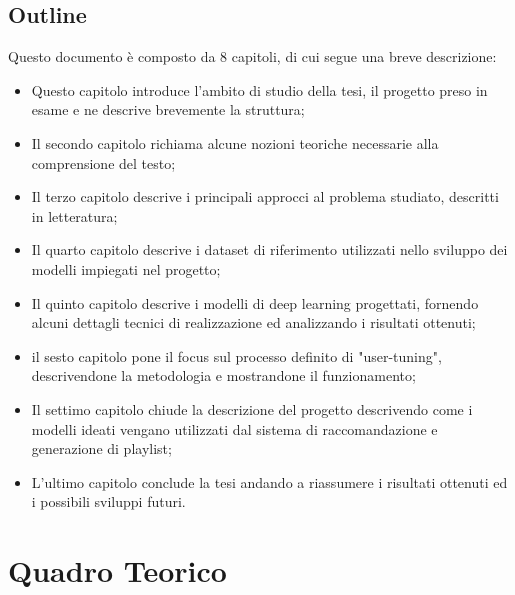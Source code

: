\documentclass[11pt]{report}
\begin{document}

\section{Outline}

Questo documento è composto da 8 capitoli, di cui segue una breve descrizione:

\begin{itemize}

    \item Questo capitolo introduce l'ambito di studio della tesi, il progetto preso in esame e ne descrive brevemente la struttura;
    
    \item Il secondo capitolo richiama alcune nozioni teoriche necessarie alla comprensione del testo;
    
    \item Il terzo capitolo descrive i principali approcci al problema studiato, descritti in letteratura;

    \item Il quarto capitolo descrive i dataset di riferimento utilizzati nello sviluppo dei modelli impiegati nel progetto;
    
    \item Il quinto capitolo descrive i modelli di deep learning progettati, fornendo alcuni dettagli tecnici di realizzazione ed analizzando i risultati ottenuti;
    
    \item il sesto capitolo pone il focus sul processo definito di "user-tuning", descrivendone la metodologia e mostrandone il funzionamento;
    
    \item Il settimo capitolo chiude la descrizione del progetto descrivendo come i modelli ideati vengano utilizzati dal sistema di raccomandazione e generazione di playlist;
    
    \item L'ultimo capitolo conclude la tesi andando a riassumere i risultati ottenuti ed i possibili sviluppi futuri.
\end{itemize}

\chapter{Quadro Teorico}
\end{document}
